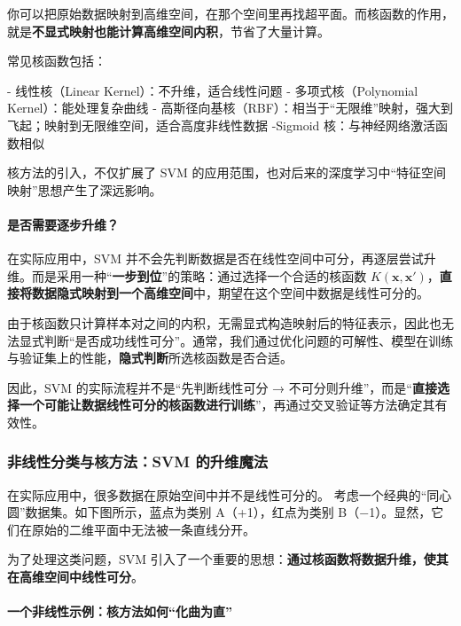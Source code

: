 你可以把原始数据映射到高维空间，在那个空间里再找超平面。而核函数的作用，就是{\bf 不显式映射也能计算高维空间内积}，节省了大量计算。

常见核函数包括：

- 线性核（Linear Kernel）：不升维，适合线性问题
- 多项式核（Polynomial Kernel）：能处理复杂曲线
- 高斯径向基核（RBF）：相当于“无限维”映射，强大到飞起；映射到无限维空间，适合高度非线性数据
-Sigmoid 核：与神经网络激活函数相似

核方法的引入，不仅扩展了 SVM 的应用范围，也对后来的深度学习中“特征空间映射”思想产生了深远影响。

\paragraph*{是否需要逐步升维？}

在实际应用中，SVM 并不会先判断数据是否在线性空间中可分，再逐层尝试升维。而是采用一种“\textbf{一步到位}”的策略：通过选择一个合适的核函数 \(K(\mathbf{x}, \mathbf{x}')\)，\textbf{直接将数据隐式映射到一个高维空间}中，期望在这个空间中数据是线性可分的。

由于核函数只计算样本对之间的内积，无需显式构造映射后的特征表示，因此也无法显式判断“是否成功线性可分”。通常，我们通过优化问题的可解性、模型在训练与验证集上的性能，\textbf{隐式判断}所选核函数是否合适。

因此，SVM 的实际流程并不是“先判断线性可分 → 不可分则升维”，而是“\textbf{直接选择一个可能让数据线性可分的核函数进行训练}”，再通过交叉验证等方法确定其有效性。

\subsubsection{非线性分类与核方法：SVM 的升维魔法}

在实际应用中，很多数据在原始空间中并不是线性可分的。
考虑一个经典的“同心圆”数据集。如下图所示，蓝点为类别 A（+1），红点为类别 B（−1）。显然，它们在原始的二维平面中无法被一条直线分开。

为了处理这类问题，SVM 引入了一个重要的思想：\textbf{通过核函数将数据升维，使其在高维空间中线性可分}。

\paragraph*{一个非线性示例：核方法如何“化曲为直”}


